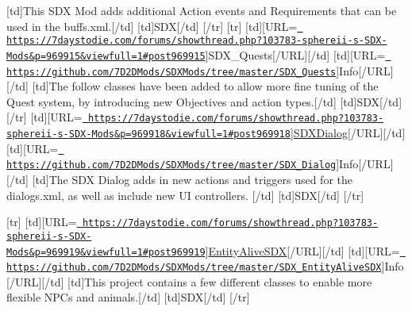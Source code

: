 \mbox{[}td\mbox{]}This S\+DX Mod adds additional Action events and Requirements that can be used in the buffs.\+xml.\mbox{[}/td\mbox{]} \mbox{[}td\mbox{]}S\+DX\mbox{[}/td\mbox{]} \mbox{[}/tr\mbox{]} \mbox{[}tr\mbox{]} \mbox{[}td\mbox{]}\mbox{[}U\+RL=\href{https://7daystodie.com/forums/showthread.php?103783-sphereii-s-SDX-Mods&p=969915&viewfull=1\#post969915}{\texttt{ https\+://7daystodie.\+com/forums/showthread.\+php?103783-\/sphereii-\/s-\/\+S\+D\+X-\/\+Mods\&p=969915\&viewfull=1\#post969915}}\mbox{]}S\+D\+X\+\_\+\+Quests\mbox{[}/\+U\+RL\mbox{]}\mbox{[}/td\mbox{]} \mbox{[}td\mbox{]}\mbox{[}U\+RL=\href{https://github.com/7D2DMods/SDXMods/tree/master/SDX_Quests}{\texttt{ https\+://github.\+com/7\+D2\+D\+Mods/\+S\+D\+X\+Mods/tree/master/\+S\+D\+X\+\_\+\+Quests}}\mbox{]}Info\mbox{[}/\+U\+RL\mbox{]}\mbox{[}/td\mbox{]} \mbox{[}td\mbox{]}The follow classes have been added to allow more fine tuning of the Quest system, by introducing new Objectives and action types.\mbox{[}/td\mbox{]} \mbox{[}td\mbox{]}S\+DX\mbox{[}/td\mbox{]} \mbox{[}/tr\mbox{]} \mbox{[}td\mbox{]}\mbox{[}U\+RL=\href{https://7daystodie.com/forums/showthread.php?103783-sphereii-s-SDX-Mods&p=969918&viewfull=1\#post969918}{\texttt{ https\+://7daystodie.\+com/forums/showthread.\+php?103783-\/sphereii-\/s-\/\+S\+D\+X-\/\+Mods\&p=969918\&viewfull=1\#post969918}}\mbox{]}\mbox{\hyperlink{class_s_d_x_dialog}{S\+D\+X\+Dialog}}\mbox{[}/\+U\+RL\mbox{]}\mbox{[}/td\mbox{]} \mbox{[}td\mbox{]}\mbox{[}U\+RL=\href{https://github.com/7D2DMods/SDXMods/tree/master/SDX_Dialog}{\texttt{ https\+://github.\+com/7\+D2\+D\+Mods/\+S\+D\+X\+Mods/tree/master/\+S\+D\+X\+\_\+\+Dialog}}\mbox{]}Info\mbox{[}/\+U\+RL\mbox{]}\mbox{[}/td\mbox{]} \mbox{[}td\mbox{]}The S\+DX Dialog adds in new actions and triggers used for the dialogs.\+xml, as well as include new UI controllers. \mbox{[}/td\mbox{]} \mbox{[}td\mbox{]}S\+DX\mbox{[}/td\mbox{]} \mbox{[}/tr\mbox{]}

\mbox{[}tr\mbox{]} \mbox{[}td\mbox{]}\mbox{[}U\+RL=\href{https://7daystodie.com/forums/showthread.php?103783-sphereii-s-SDX-Mods&p=969919&viewfull=1\#post969919}{\texttt{ https\+://7daystodie.\+com/forums/showthread.\+php?103783-\/sphereii-\/s-\/\+S\+D\+X-\/\+Mods\&p=969919\&viewfull=1\#post969919}}\mbox{]}\mbox{\hyperlink{class_entity_alive_s_d_x}{Entity\+Alive\+S\+DX}}\mbox{[}/\+U\+RL\mbox{]}\mbox{[}/td\mbox{]} \mbox{[}td\mbox{]}\mbox{[}U\+RL=\href{https://github.com/7D2DMods/SDXMods/tree/master/SDX_EntityAliveSDX}{\texttt{ https\+://github.\+com/7\+D2\+D\+Mods/\+S\+D\+X\+Mods/tree/master/\+S\+D\+X\+\_\+\+Entity\+Alive\+S\+DX}}\mbox{]}Info\mbox{[}/\+U\+RL\mbox{]}\mbox{[}/td\mbox{]} \mbox{[}td\mbox{]}This project contains a few different classes to enable more flexible N\+P\+Cs and animals.\mbox{[}/td\mbox{]} \mbox{[}td\mbox{]}S\+DX\mbox{[}/td\mbox{]} \mbox{[}/tr\mbox{]}

